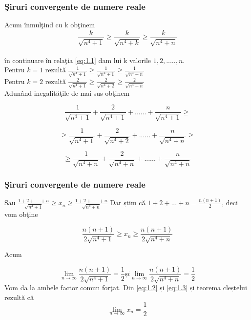 \documentclass{beamer}
\theoremstyle{plain}
\begin{document}
\frame
{
\frametitle{\c Siruri convergente de numere reale}


Acum \^ inmul\c tind cu k ob\c tinem 
\begin{displaymath}
\frac{k}{\sqrt{n^{4}+1}}\geq \frac{k}{\sqrt{n^{4}+k}}\geq \frac{k}{\sqrt{n^{4}+n}} \label{eq:1.1} \tag{1.1}
\end{displaymath}
\\ \^ in continuare \^ in rela\c tia \ref{eq:1.1} dam lui k valorile \(1,2,.....,n\). 
\\Pentru \( k = 1\) rezult\u a
\(\frac{1}{\sqrt{n^{4}+1}}\geq \frac{1}{\sqrt{n^{4}+1}}\geq \frac{1}{\sqrt{n^{4}+n}}\)
\\ Pentru \( k = 2\) rezult\u a
 \(\frac{2}{\sqrt{n^{4}+1}}\geq \frac{2}{\sqrt{n^{4}+2}}\geq \frac{2}{\sqrt{n^{4}+n}}\)
\\ Adun\^ and inegalit\u a\c tile de mai sus ob\c tinem 

\begin{displaymath}
 \frac{1}{\sqrt{n^{4}+1}}+ \frac{2}{\sqrt{n^{4}+1}}+......+ \frac{n}{\sqrt{n^{4}+1}} \geq 
\end{displaymath}
 
\begin{displaymath}
 \geq \frac{1}{\sqrt{n^{4}+1}}+ \frac{2}{\sqrt{n^{4}+2}}+......+ \frac{n}{\sqrt{n^{4}+n}}\geq
\end{displaymath}
 
\begin{displaymath}
 \geq \frac{1}{\sqrt{n^{4}+n}}+ \frac{2}{\sqrt{n^{4}+n}}+......+ \frac{n}{\sqrt{n^{4}+n}}
\end{displaymath}

}
\frame
{
\frametitle{\c Siruri convergente de numere reale}
Sau \(\frac{1+2+....+n}{\sqrt{n^{4}+1}}\geq x_{n}\geq \frac{1+2+.....+n}{\sqrt{n^{4}+n}}\)
Dar știm c\u a \(1+2+...+n = \frac{n(n+1)}{2}\), 
deci vom ob\c tine 

\begin{displaymath}
  \frac{n(n+1)}{2\sqrt{n^{4}+1}}\geq x_{n}\geq \frac{n(n+1)}{2\sqrt{n^{4}+n}} \label{eq:1.2} \tag{1.2}
\end{displaymath}

Acum 

\begin{displaymath}
 \lim_{n \to \infty }\frac{n(n+1)}{2\sqrt{n^{4}+1}}=\frac{1}{2} și \lim_{n \to \infty }\frac{n(n+1)}{2\sqrt{n^{4}+n}}=\frac{1}{2} \label{eq:1.3} \tag{1.3}
\end{displaymath}
Vom da la ambele factor comun for\c tat. Din \ref{eq:1.2} și \ref{eq:1.3} și teorema cleștelui rezult\u a c\u a
\begin{displaymath}
 \lim_{n \to \infty }x_{n}=\frac{1}{2}
\end{displaymath}
}
\end{document}
